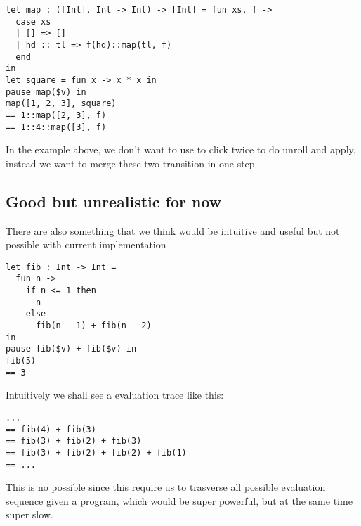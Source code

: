 \begin{verbatim}
let map : ([Int], Int -> Int) -> [Int] = fun xs, f ->
  case xs
  | [] => []
  | hd :: tl => f(hd)::map(tl, f)
  end
in
let square = fun x -> x * x in
pause map($v) in
map([1, 2, 3], square)
== 1::map([2, 3], f)
== 1::4::map([3], f)
\end{verbatim}

In the example above, we don't want to use to click twice to do unroll and apply, instead we want to merge these two transition
in one step.

\subsection{Good but unrealistic for now}

There are also something that we think would be intuitive and useful but not possible with current implementation

\begin{verbatim}
let fib : Int -> Int =
  fun n ->
    if n <= 1 then
      n
    else
      fib(n - 1) + fib(n - 2)
in
pause fib($v) + fib($v) in
fib(5)
== 3
\end{verbatim}

Intuitively we shall see a evaluation trace like this:
\begin{verbatim}
...
== fib(4) + fib(3)
== fib(3) + fib(2) + fib(3)
== fib(3) + fib(2) + fib(2) + fib(1)
== ...
\end{verbatim}

This is no possible since this require us to trasverse all possible
evaluation sequence given a program, which would be super powerful,
but at the same time super slow.

